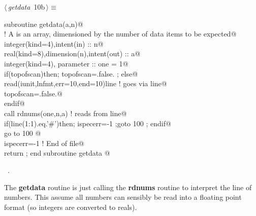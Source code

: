 \documentclass[10pt,a4paper,notitlepage]{article}
\newcommand{\code}[1]{\textbf{\textsf{#1}}} %
\begin{document}
\begin{flushleft} \small
\begin{minipage}{\linewidth}\label{scrap11}\raggedright\small
{} $\langle\,${\it getdata}\nobreak\ {\footnotesize {10b}}$\,\rangle\equiv$
\vspace{-1ex}
\begin{list}{}{} \item
\mbox{}\verb@      subroutine getdata(a,n)@\\
\mbox{}\verb@! A is an array, dimensioned by the number of data items to be expected@\\
\mbox{}\verb@      integer(kind=4),intent(in) :: n@\\
\mbox{}\verb@      real(kind=8),dimension(n),intent(out) :: a@\\
\mbox{}\verb@      integer(kind=4), parameter :: one = 1@\\
\mbox{}\verb@      if(topofscan)then; topofscan=.false. ; else@\\
\mbox{}\verb@        read(iunit,lnfmt,err=10,end=10)line                  ! goes via line@\\
\mbox{}\verb@        topofscan=.false.@\\
\mbox{}\verb@      endif@\\
\mbox{}\verb@      call rdnums(one,n,a)                                   ! reads from line@\\
\mbox{}\verb@      if(line(1:1).eq.'#')then; ispecerr=-1 ;goto 100 ; endif@\\
\mbox{}\verb@      go to 100    @\\
\mbox{}    ispecerr=-1 ! End of file@\\
\mbox{}   return ; end subroutine getdata                                        @{\NWsep}
\end{list}
\vspace{-1.5ex}
\footnotesize
\begin{list}{}{\setlength{\itemsep}{-\parsep}\setlength{\itemindent}{-\leftmargin}}
\item \NWtxtMacroRefIn\ .

\item{}
\end{list}
\end{minipage}\vspace{4ex}
\end{flushleft}
The \code{getdata} routine is just calling the \code{rdnums} routine to 
interpret the line of numbers. 
This assume all numbers can sensibly be read into a floating point format (so
integers are converted to reals).
\end{document}
